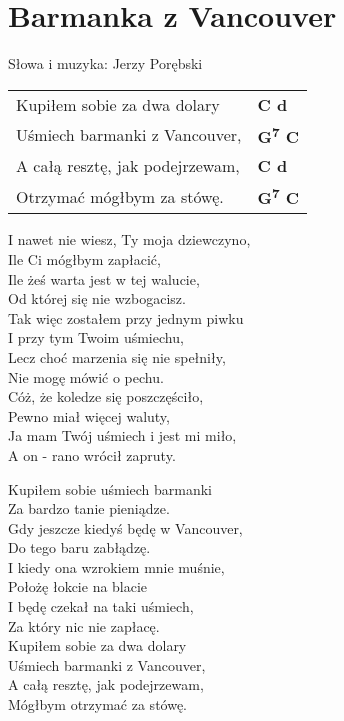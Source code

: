 \section{Barmanka z Vancouver}

Słowa i muzyka: Jerzy Porębski

\vspace{2em}
\begin{tabular}{@{}p{8cm}@{}l@{}}
Kupiłem sobie za dwa dolary & \bfseries C d\\
Uśmiech barmanki z Vancouver, & \bfseries G\textsuperscript{7} C\\
A całą resztę, jak podejrzewam, & \bfseries C d\\
Otrzymać mógłbym za stówę. & \bfseries G\textsuperscript{7} C\\
\end{tabular}

\vspace{1em}
I nawet nie wiesz, Ty moja dziewczyno, \\
Ile Ci mógłbym zapłacić, \\
Ile żeś warta jest w tej walucie, \\
Od której się nie wzbogacisz. \\

Tak więc zostałem przy jednym piwku \\
I przy tym Twoim uśmiechu, \\
Lecz choć marzenia się nie spełniły, \\
Nie mogę mówić o pechu. \\

Cóż, że koledze się poszczęściło, \\
Pewno miał więcej waluty, \\
Ja mam Twój uśmiech i jest mi miło, \\
A on - rano wrócił zapruty. \\

\begin{multicols}{2}
Kupiłem sobie uśmiech barmanki \\
Za bardzo tanie pieniądze. \\
Gdy jeszcze kiedyś będę w Vancouver, \\
Do tego baru zabłądzę. \\

\columnbreak
I kiedy ona wzrokiem mnie muśnie, \\
Położę łokcie na blacie \\
I będę czekał na taki uśmiech, \\
Za który nic nie zapłacę. \\

Kupiłem sobie za dwa dolary \\
Uśmiech barmanki z Vancouver, \\
A całą resztę, jak podejrzewam, \\
Mógłbym otrzymać za stówę.
\end{multicols}